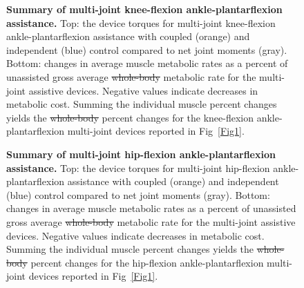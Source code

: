 \documentclass[10pt,letterpaper]{article}
\providecommand{\DIFaddtex}[1]{{\protect\color{blue}{#1}}} %
\providecommand{\DIFdeltex}[1]{{\protect\color{red}\sout{#1}}}                      %
\providecommand{\DIFaddFL}[1]{\DIFadd{#1}} %
\providecommand{\DIFdelFL}[1]{\DIFdel{#1}} %
\providecommand{\DIFaddbeginFL}{} %
\providecommand{\DIFaddendFL}{} %
\providecommand{\DIFdelbeginFL}{} %
\providecommand{\DIFdelendFL}{} %
\providecommand{\DIFadd}[1]{\texorpdfstring{\DIFaddtex{#1}}{#1}} %
\providecommand{\DIFdel}[1]{\texorpdfstring{\DIFdeltex{#1}}{}} %
\newcommand{\DIFscaledelfig}{0.5}
\newlength{\DIFdelgraphicswidth} %
\newlength{\DIFdelgraphicsheight} %
\newcommand{\DIFaddincludegraphics}[2][]{{\color{blue}\fbox{\DIFOincludegraphics[#1]{#2}}}} %
\newcommand{\DIFdelincludegraphics}[2][]{%
\sbox{\DIFdelgraphicsbox}{\DIFOincludegraphics[#1]{#2}}%
\settoboxwidth{\DIFdelgraphicswidth}{\DIFdelgraphicsbox} %
\settoboxtotalheight{\DIFdelgraphicsheight}{\DIFdelgraphicsbox} %
\scalebox{\DIFscaledelfig}{%
\parbox[b]{\DIFdelgraphicswidth}{\usebox{\DIFdelgraphicsbox}\\[-\baselineskip] \rule{\DIFdelgraphicswidth}{0em}}\llap{\resizebox{\DIFdelgraphicswidth}{\DIFdelgraphicsheight}{%
\setlength{\unitlength}{\DIFdelgraphicswidth}%
\begin{picture}(1,1)%
\thicklines\linethickness{2pt} %
{\color[rgb]{1,0,0}\put(0,0){\framebox(1,1){}}}%
{\color[rgb]{1,0,0}\put(0,0){\line( 1,1){1}}}%
{\color[rgb]{1,0,0}\put(0,1){\line(1,-1){1}}}%
\end{picture}%
}*{3pt}}} %
} %
\DeclareRobustCommand{\DIFaddbeginFL}{\DIFOaddbeginFL \let\includegraphics\DIFaddincludegraphics} %
\DeclareRobustCommand{\DIFaddendFL}{\DIFOaddendFL \let\includegraphics\DIFOincludegraphics} %
\DeclareRobustCommand{\DIFdelbeginFL}{\DIFOdelbeginFL \let\includegraphics\DIFdelincludegraphics} %
\DeclareRobustCommand{\DIFdelendFL}{\DIFOaddendFL \let\includegraphics\DIFOincludegraphics} %
\begin{document}
\begin{figure}[!h]
\begin{adjustwidth}{-1in}{0in} %
    \centering
    \caption{{\bf Summary of multi-joint knee-flexion ankle-plantarflexion assistance.}
        Top: the device torques for multi-joint knee-flexion ankle-plantarflexion assistance with coupled (orange) and independent (blue) control compared to net joint moments (gray). Bottom: changes in average muscle metabolic rates as a percent of unassisted gross average \DIFdelbeginFL \DIFdelFL{whole-body }\DIFdelendFL \DIFaddbeginFL \DIFaddFL{total }\DIFaddendFL metabolic rate for the multi-joint assistive devices. Negative values indicate decreases in metabolic cost. \DIFaddbeginFL \DIFaddFL{Solid bars and error bars indicate the mean and standard deviation across subjects, respectively. }\DIFaddendFL Summing the individual muscle percent changes yields the \DIFdelbeginFL \DIFdelFL{whole-body }\DIFdelendFL \DIFaddbeginFL \DIFaddFL{total }\DIFaddendFL percent changes for the knee-flexion ankle-plantarflexion multi-joint devices reported in Fig~\ref{Fig1}.}
\label{Fig4}
\end{adjustwidth}
\end{figure}

\begin{figure}[!h]
\begin{adjustwidth}{-1in}{0in} %
    \centering
    \caption{{\bf Summary of multi-joint hip-flexion ankle-plantarflexion assistance.}
        Top: the device torques for multi-joint hip-flexion ankle-plantarflexion assistance with coupled (orange) and independent (blue) control compared to net joint moments (gray). Bottom: changes in average muscle metabolic rates as a percent of unassisted gross average \DIFdelbeginFL \DIFdelFL{whole-body }\DIFdelendFL \DIFaddbeginFL \DIFaddFL{total }\DIFaddendFL metabolic rate for the multi-joint assistive devices. Negative values indicate decreases in metabolic cost. \DIFaddbeginFL \DIFaddFL{Solid bars and error bars indicate the mean and standard deviation across subjects, respectively. }\DIFaddendFL Summing the individual muscle percent changes yields the \DIFdelbeginFL \DIFdelFL{whole-body }\DIFdelendFL \DIFaddbeginFL \DIFaddFL{total }\DIFaddendFL percent changes for the hip-flexion ankle-plantarflexion multi-joint devices reported in Fig~\ref{Fig1}.}
\label{Fig5}
\end{adjustwidth}
\end{figure}    
\end{document}
